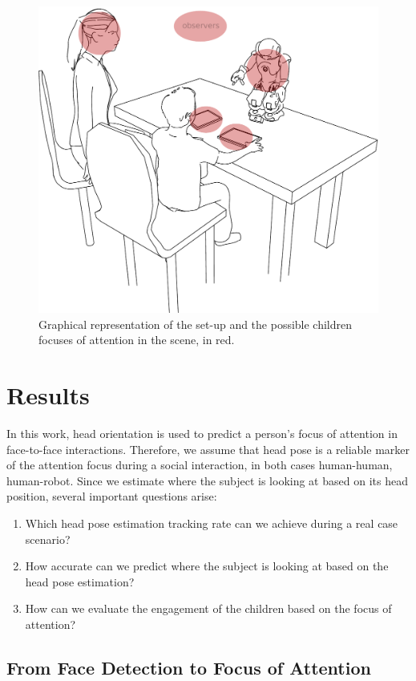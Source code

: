 \documentclass{sig-alternate}
\begin{document}
\begin{figure}[h!]
    \centering
    \includegraphics[width=0.7\columnwidth]{drawSetup}
    \caption{\small Graphical representation of the set-up and the possible children focuses of attention in the scene, in red.}
    \label{drawSetup}
\end{figure}


\section{Results}

In this work, head orientation is used to predict a person's focus of attention
in face-to-face interactions. Therefore, we assume that head pose is a reliable
marker of the attention focus during a social interaction, in both cases
human-human, human-robot. Since we estimate where the subject is looking at
based on its head position, several important questions arise:

\begin{enumerate}
\item Which head pose estimation tracking rate can we achieve during a real case scenario?  
\item How accurate can we predict where the subject is looking at based on the head pose estimation?
\item How can we evaluate the engagement of the children based on the focus of attention?\newline
\end{enumerate}

\subsection{From Face Detection to Focus of Attention} \label{fromFaceTo}
\end{document}
